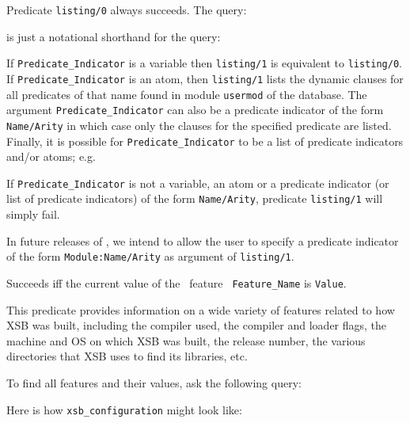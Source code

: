 \begin{description}
    Predicate {\tt listing/0} always succeeds.  The query:


    \noindent
    is just a notational shorthand for the query:


    If {\tt Predicate\_Indicator} is a variable then {\tt listing/1} is
    equivalent to {\tt listing/0}.
    If {\tt Predicate\_Indicator} is an atom, then {\tt listing/1} 
    lists the dynamic clauses for all predicates of that name found in 
    module {\tt usermod} of the database.
    The argument {\tt Predicate\_Indicator} can also be a predicate 
    indicator of the form {\tt Name/Arity} in which case only the 
    clauses for the specified predicate are listed.
    Finally, it is possible for {\tt Predicate\_Indicator}
    to be a list of predicate indicators and/or atoms; e.g.


    If {\tt Predicate\_Indicator} is not a variable, an atom or a predicate 
    indicator (or list of predicate indicators) of the form {\tt Name/Arity}, 
    predicate {\tt listing/1} will simply fail.

    In future releases of \ourprolog, we intend to allow the user to
    specify a predicate indicator of the form {\tt Module:Name/Arity} 
    as argument of {\tt listing/1}.

    Succeeds iff the current value of the \ourprolog\ feature {\tt
    Feature\_Name} is {\tt Value}.

    This predicate provides information on a wide variety of features
    related to how XSB was built, including the compiler used, the compiler
    and loader flags, the machine and OS on which XSB was built, the
    release number, the various directories that XSB uses to find its
    libraries, etc.

    To find all features and their values, ask the following query:


    Here is how {\tt xsb\_configuration} might look like:


\end{description}
